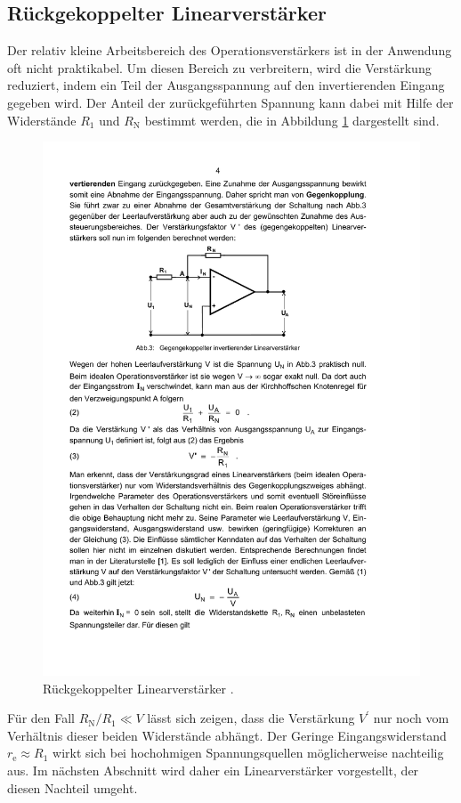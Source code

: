 \subsection{Rückgekoppelter Linearverstärker}
\label{subsec:rueck-linearverstärker}
Der relativ kleine Arbeitsbereich des Operationsverstärkers ist in der
Anwendung oft nicht praktikabel. Um diesen Bereich zu verbreitern, wird die
Verstärkung reduziert, indem ein Teil der Ausgangsspannung auf den
invertierenden Eingang gegeben wird.
Der Anteil der zurückgeführten Spannung kann dabei mit Hilfe der Widerstände
$R_1$ und $R_\text{N}$ bestimmt werden, die in Abbildung \ref{fig:linear}
dargestellt sind.
\begin{figure}
    \centering
    \includegraphics[width=0.7\linewidth]{img/linearverstaerker.pdf}
    \caption{Rückgekoppelter Linearverstärker \cite{V51}.}
    \label{fig:linear}
\end{figure}
Für den Fall $R_\text{N}/R_1 \ll V$
lässt sich zeigen, dass die Verstärkung $V^\prime$ nur noch vom Verhältnis
dieser beiden Widerstände abhängt.
Der Geringe Eingangswiderstand $r_\text{e} \approx R_1$ wirkt sich bei
hochohmigen Spannungsquellen möglicherweise nachteilig aus. Im nächsten
Abschnitt wird daher ein Linearverstärker vorgestellt, der diesen Nachteil
umgeht.

